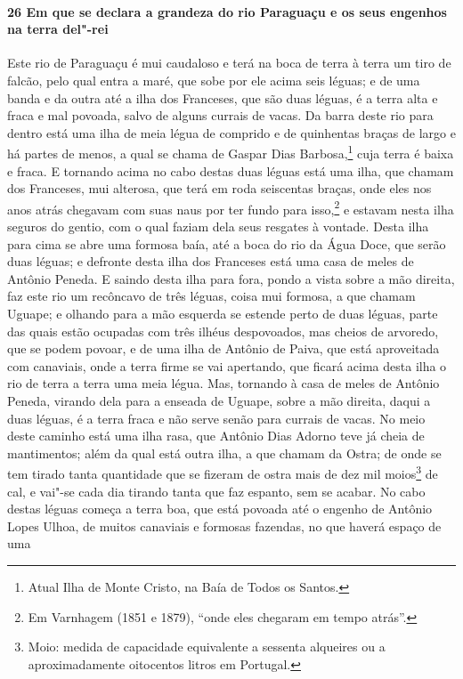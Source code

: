 \begin{linenumbers}
\paragraph{26 Em que se declara a grandeza do rio Paraguaçu e os seus engenhos na terra
del"-rei}\quad
Este rio de Paraguaçu é mui caudaloso e terá na boca de terra à terra um tiro de falcão,
pelo qual entra a maré, que sobe por ele acima seis léguas; e de uma banda e da outra até
a ilha dos Franceses, que são duas léguas, é a terra alta e fraca e mal povoada, salvo de
alguns currais de vacas. Da barra deste rio para dentro está uma ilha de meia légua de
comprido e de quinhentas braças de largo e há partes de menos, a qual se chama de Gaspar
Dias Barbosa,\footnote{ Atual Ilha de Monte Cristo, na Baía de Todos os Santos.} cuja
terra é baixa e fraca. E tornando acima no cabo destas duas léguas está uma ilha, que
chamam dos Franceses, mui alterosa, que terá em roda seiscentas braças, onde eles nos anos
atrás chegavam com suas naus por ter fundo para isso,\footnote{ Em Varnhagem (1851 e
1879), ``onde eles chegaram em tempo atrás''.} e estavam nesta ilha seguros do gentio, com
o qual faziam dela seus resgates à vontade. Desta ilha para cima se abre uma formosa baía,
até a boca do rio da Água Doce, que serão duas léguas; e defronte desta ilha dos Franceses
está uma casa de meles de Antônio Peneda. E saindo desta ilha para fora, pondo a vista
sobre a mão direita, faz este rio um recôncavo de três léguas, coisa mui formosa, a que
chamam Uguape; e olhando para a mão esquerda se estende perto de duas léguas, parte das
quais estão ocupadas com três ilhéus despovoados, mas cheios de arvoredo, que se podem
povoar, e de uma ilha de Antônio de Paiva, que está aproveitada com canaviais, onde a
terra firme se vai apertando, que ficará acima desta ilha o rio de terra a terra uma meia
légua. Mas, tornando à casa de meles de Antônio Peneda, virando dela para a enseada de
Uguape, sobre a mão direita, daqui a duas léguas, é a terra fraca e não serve senão para
currais de vacas. No meio deste caminho está uma ilha rasa, que Antônio Dias Adorno teve
já cheia de mantimentos; além da qual está outra ilha, a que chamam da Ostra; de onde se
tem tirado tanta quantidade que se fizeram de ostra mais de dez mil moios\footnote{ Moio:
medida de capacidade equivalente a sessenta alqueires ou a aproximadamente oitocentos
litros em Portugal.} de cal, e vai"-se cada dia tirando tanta que faz espanto, sem se
acabar. No cabo destas léguas começa a terra boa, que está povoada até o engenho de
Antônio Lopes Ulhoa, de muitos canaviais e formosas fazendas, no que haverá espaço de uma

\end{linenumbers}
